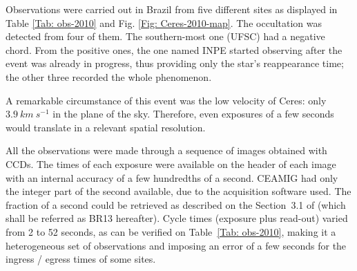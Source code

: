 \documentclass[useAMS,usenatbib]{mn2e}
\begin{document}
Observations were carried out in Brazil from five different sites as displayed in Table \ref{Tab: obs-2010} and Fig. \ref{Fig: Ceres-2010-map}. The occultation was detected from four of them. The southern-most one (UFSC) had a negative chord. From the positive ones, the one named INPE started observing after the event was already in progress, thus providing only the star's reappearance time; the other three recorded the whole phenomenon.

A remarkable circumstance of this event was the low velocity of Ceres: only $3.9~km~s^{-1}$ in the plane of the sky. Therefore, even exposures of a few seconds would translate in a relevant spatial resolution.

All the observations were made through a sequence of images obtained with CCDs. The times of each exposure were available on the header of each image with an internal accuracy of a few hundredths of a second. CEAMIG had only the integer part of the second available, due to the acquisition software used. The fraction of a second could be retrieved as described on the Section~3.1 of \cite{BragaRibas2013}  (which shall be referred as BR13 hereafter). Cycle times (exposure plus read-out) varied from 2 to 52 seconds, as can be verified on Table~\ref{Tab: obs-2010}, making it a heterogeneous set of observations and imposing an error of a few seconds for the ingress / egress times of some sites.


\end{document}
